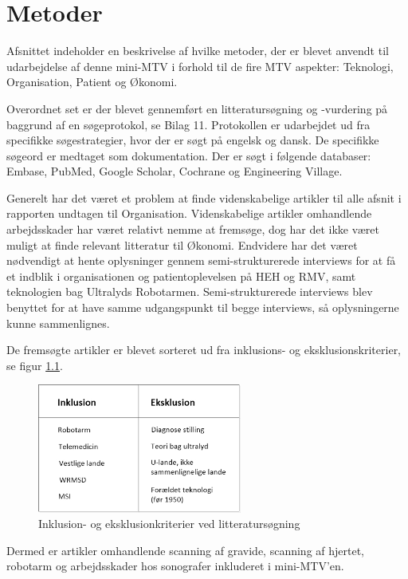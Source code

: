 \chapter{Metoder}
Afsnittet indeholder en beskrivelse af hvilke metoder, der er blevet anvendt til udarbejdelse af denne mini-MTV i forhold til de fire MTV aspekter: Teknologi, Organisation, Patient og Økonomi.

Overordnet set er der blevet gennemført en litteratursøgning og -vurdering på baggrund af en søgeprotokol, se Bilag 11. Protokollen er udarbejdet ud fra specifikke søgestrategier, hvor der er søgt på engelsk og dansk. De specifikke søgeord er medtaget som dokumentation. Der er søgt i følgende databaser: Embase, PubMed, Google Scholar, Cochrane og Engineering Village. 

Generelt har det været et problem at finde videnskabelige artikler til alle afsnit i rapporten undtagen til Organisation. Videnskabelige artikler omhandlende arbejdsskader har været relativt nemme at fremsøge, dog har det ikke været muligt at finde relevant litteratur til Økonomi. Endvidere har det været nødvendigt at hente oplysninger gennem semi-strukturerede interviews for at få et indblik i organisationen og patientoplevelsen på HEH og RMV, samt teknologien bag Ultralyds Robotarmen. Semi-strukturerede interviews blev benyttet for at have samme udgangspunkt til begge interviews, så oplysningerne kunne sammenlignes.   

De fremsøgte artikler er blevet sorteret ud fra inklusions- og eksklusionskriterier, se figur \ref{InklusionEksklusion}. 

\begin{figure}[H]\centering
	\includegraphics[width = 0.6\textwidth]{Figurer/InklusionEksklusion}
	\caption{Inklusion- og eksklusionkriterier ved litteratursøgning}
	\label{InklusionEksklusion}
\end{figure}

Dermed er artikler omhandlende scanning af gravide, scanning af hjertet, robotarm og arbejdsskader hos sonografer inkluderet i mini-MTV'en.

